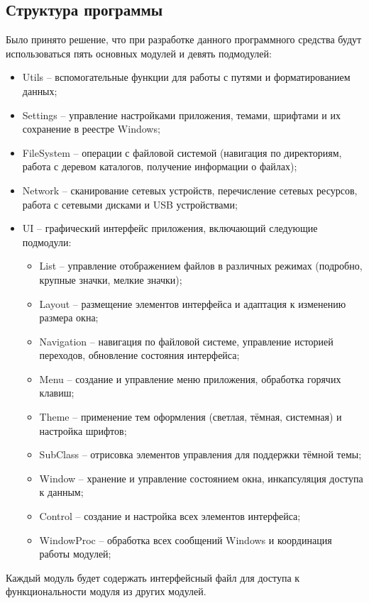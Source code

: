 \subsection{Структура программы}

Было принято решение, что при разработке данного программного средства будут использоваться пять основных модулей и девять подмодулей:
\begin{itemize}
    \item Utils -- вспомогательные функции для работы с путями и форматированием данных;
    \item Settings -- управление настройками приложения, темами, шрифтами и их сохранение в реестре Windows;
    \item FileSystem -- операции с файловой системой (навигация по директориям, работа с деревом каталогов, получение информации о файлах);
    \item Network -- сканирование сетевых устройств, перечисление сетевых ресурсов, работа с сетевыми дисками и USB устройствами;
    \item UI -- графический интерфейс приложения, включающий следующие подмодули:
    \begin{itemize}
        \item List -- управление отображением файлов в различных режимах (подробно, крупные значки, мелкие значки);
        \item Layout -- размещение элементов интерфейса и адаптация к изменению размера окна;
        \item Navigation -- навигация по файловой системе, управление историей переходов, обновление состояния интерфейса;
        \item Menu -- создание и управление меню приложения, обработка горячих клавиш;
        \item Theme -- применение тем оформления (светлая, тёмная, системная) и настройка шрифтов;
        \item SubClass -- отрисовка элементов управления для поддержки тёмной темы;
        \item Window -- хранение и управление состоянием окна, инкапсуляция доступа к данным;
        \item Control -- создание и настройка всех элементов интерфейса;
        \item WindowProc -- обработка всех сообщений Windows и координация работы модулей;
    \end{itemize}
\end{itemize}

Каждый модуль будет содержать интерфейсный файл для доступа к функциональности модуля из других модулей.